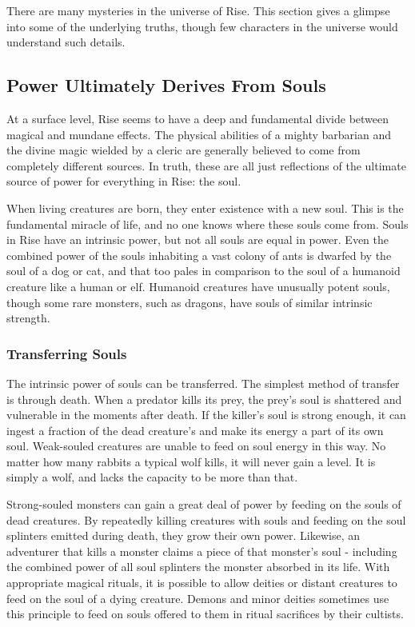     There are many mysteries in the universe of Rise.
    This section gives a glimpse into some of the underlying truths, though few characters in the universe would understand such details.

    \subsection{Power Ultimately Derives From Souls}
        At a surface level, Rise seems to have a deep and fundamental divide between magical and mundane effects.
        The physical abilities of a mighty barbarian and the divine magic wielded by a cleric are generally believed to come from completely different sources.
        In truth, these are all just reflections of the ultimate source of power for everything in Rise: the soul.

        When living creatures are born, they enter existence with a new soul.
        This is the fundamental miracle of life, and no one knows where these souls come from.
        Souls in Rise have an intrinsic power, but not all souls are equal in power.
        Even the combined power of the souls inhabiting a vast colony of ants is dwarfed by the soul of a dog or cat, and that too pales in comparison to the soul of a humanoid creature like a human or elf.
        Humanoid creatures have unusually potent souls, though some rare monsters, such as dragons, have souls of similar intrinsic strength.

        \subsubsection{Transferring Souls}
            The intrinsic power of souls can be transferred.
            The simplest method of transfer is through death.
            When a predator kills its prey, the prey's soul is shattered and vulnerable in the moments after death.
            If the killer's soul is strong enough, it can ingest a fraction of the dead creature's and make its energy a part of its own soul.
            Weak-souled creatures are unable to feed on soul energy in this way.
            No matter how many rabbits a typical wolf kills, it will never gain a level.
            It is simply a wolf, and lacks the capacity to be more than that.

            Strong-souled monsters can gain a great deal of power by feeding on the souls of dead creatures.
            By repeatedly killing creatures with souls and feeding on the soul splinters emitted during death, they grow their own power.
            Likewise, an adventurer that kills a monster claims a piece of that monster's soul - including the combined power of all soul splinters the monster absorbed in its life.
            With appropriate magical rituals, it is possible to allow deities or distant creatures to feed on the soul of a dying creature.
            Demons and minor deities sometimes use this principle to feed on souls offered to them in ritual sacrifices by their cultists.

